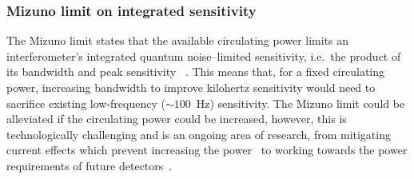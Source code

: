 \subsubsection{Mizuno limit on integrated sensitivity}
\label{sec:circulating_power}

The Mizuno limit states that the available circulating power limits an interferometer's integrated quantum noise--limited sensitivity, i.e.\ the product of its bandwidth and peak sensitivity~\cite{miaoFundamentalQuantumLimit2017} .
This means that, for a fixed circulating power, increasing bandwidth to improve kilohertz sensitivity would need to sacrifice existing low-frequency ($\sim100$~Hz) sensitivity. %
The Mizuno limit could be alleviated if the circulating power could be increased, however, this is technologically challenging and is an ongoing area of research, from mitigating current effects which prevent increasing the power~\cite{Brooks_2021,PhysRevLett.114.161102} to working towards the power requirements of future detectors~\cite{}. 
